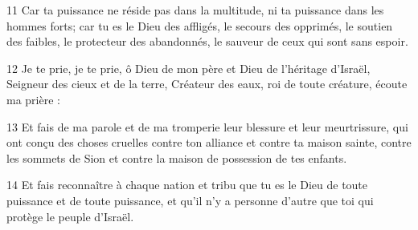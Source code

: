 \par 11 Car ta puissance ne réside pas dans la multitude, ni ta puissance dans les hommes forts; car tu es le Dieu des affligés, le secours des opprimés, le soutien des faibles, le protecteur des abandonnés, le sauveur de ceux qui sont sans espoir.
\par 12 Je te prie, je te prie, ô Dieu de mon père et Dieu de l'héritage d'Israël, Seigneur des cieux et de la terre, Créateur des eaux, roi de toute créature, écoute ma prière :
\par 13 Et fais de ma parole et de ma tromperie leur blessure et leur meurtrissure, qui ont conçu des choses cruelles contre ton alliance et contre ta maison sainte, contre les sommets de Sion et contre la maison de possession de tes enfants.
\par 14 Et fais reconnaître à chaque nation et tribu que tu es le Dieu de toute puissance et de toute puissance, et qu'il n'y a personne d'autre que toi qui protège le peuple d'Israël.


